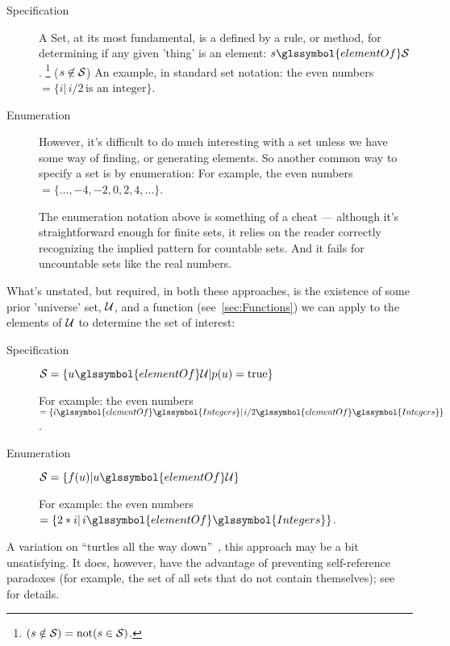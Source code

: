 \begin{description}

\item[Specification]

A \gls{Set}, at its most fundamental, is a defined by a rule,
or method,
for determining if any given 'thing' is an element: 
$s \glssymbol{elementOf} \aSet{S}$.
\footnote{$(s \notin \mathcal{S}) = \text{not}(s \in \mathcal{S})$.}
($s \not\in \mathcal{S}$)
An example, in standard set notation:
the even numbers $= \{ i | \, i/2 \, \text{is an integer}\}$.

\item[Enumeration]

However, it's difficult to do much interesting with a set
unless we have some way of finding, or generating elements.
So another common way to specify a set is by enumeration:
For example, the even numbers $= \{ \ldots, -4, -2, 0, 2 ,4,
\ldots \}$.

The enumeration notation above is something of a cheat ---
although it's straightforward enough for finite sets, it relies on
the reader correctly recognizing the implied pattern for countable
sets.
And it fails for uncountable sets like the real numbers.

\end{description}

What's unstated, but required, in both these approaches, is the
existence of some prior 'universe' set, $\mathcal{U}$, and a function
(see~\autoref{sec:Functions}) we can apply to the elements of
$\mathcal{U}$ to determine the set of interest:

\begin{description}
\item[Specification] 
$\aSet{S} =
\{ u \glssymbol{elementOf} \aSet{U} | p(u) = \text{true} \}$ 

For example: the even numbers $= \{ i \glssymbol{elementOf} 
\glssymbol{Integers} |
 \, i/2 \glssymbol{elementOf} \glssymbol{Integers} \}$.

\item[Enumeration]
$\aSet{S} =
\{ f(u) | u \glssymbol{elementOf} \aSet{U} \}$ 

For example: the even numbers $= \{ 2*i | \, i
\glssymbol{elementOf} \glssymbol{Integers} \}$.

\end{description}
A variation on 
``turtles all the way down''~\cite{xkcd:Turtles, wiki:Turtles},
this approach may be a bit unsatisfying.
It does, however, have the advantage of preventing self-reference
paradoxes (for example, 
the set of all sets that do not contain themselves); 
see~\cite[Halmos, \textit{Naive Set Theory,} section 2]
{Halmos1960Naive} for details.

